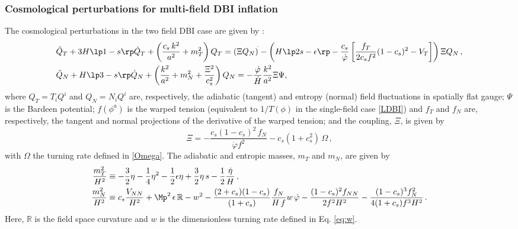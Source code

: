 \subsubsection*{Cosmological perturbations for multi-field DBI inflation}

The cosmological perturbations in the two field DBI case are given by \cite{Langlois:2008mn,Langlois:2008wt,Langlois:2008qf}:
\begin{subequations}
 \begin{align}
     &\ddot Q_T + 3H\lp 1-s \rp \dot Q_T + \left(\frac{c_s\,k^2}{a^2} +m_T^2  \right) Q_T = 
\left(\Xi Q_N\right)^{\Large\dot{}} -\left( H\lp 2s-\epsilon\rp - \frac{c_s}{\dot \varphi}\left[\frac{f_T}{2c_sf^2}(1-c_s)^2 - V_T\right] \right) \Xi Q_N\,, \label{QT} \\
& \ddot Q_N + H\lp 3-s\rp \dot Q_N + \left(\frac{k^2}{a^2} +m_N^2 +\frac{\Xi^2}{c_s^2} \right) Q_N =- 
\frac{\dot \varphi}{\dot H} \frac{k^2}{a^2}\Xi \Psi,  \label{QN}
 \end{align}
\end{subequations}
%
where $Q_T=T_i Q^i $ and $Q_N=N_i Q^i$ are, respectively, the adiabatic (tangent) and entropy (normal) field fluctuations in spatially flat gauge; $\Psi$ is the Bardeen potential; $f(\phi^a) $ is the warped tension (equivalent to $1/T(\phi)$ in the single-field case \eqref{LDBI}) and $f_T$ and $f_N$ are, respectively, the tangent and normal projections of the derivative of the warped tension; and the coupling, $\Xi$, is given by
\begin{equation}\label{eq:Xi}
\Xi= -\frac{c_s(1-c_s)^2 \,f_N}{\dot \varphi f^2} -c_s(1+c_s^2)\,\Omega \,,
\end{equation}
with $\Omega$ the turning rate defined in \eqref{Omega}.
The adiabatic and entropic masses,  $m_T$ and $m_N$,  are given by 
\begin{subequations}
 \begin{align}
\label{amass}
\frac{m^2_T}{H^2}  &\equiv -\frac{3}{2}\eta- \frac{1}{4}\eta^2 -\frac{1}{2} \epsilon\eta+\frac32\eta \,s -\frac{1}{2}\frac{\dot\eta}{H} \,,\\
\label{emass}
\frac{m_N^2}{H^2} & \equiv c_s\frac{V_{NN}}{H^2} + \Mp^2\, \epsilon  \,{\mathbb R} - 
 w^2 - \frac{(2+c_s)(1-c_s)}{(1+c_s)}\frac{f_N}{H\,f}w\, \dot \varphi  - \frac{(1-c_s)^2f_{NN} }{2f^2H^2} 
 -\frac{(1-c_s)^3 f_N^2}{4(1+c_s)f^3H^2}\,.
\end{align}
\end{subequations}
Here, ${\mathbb R} $ is the field space curvature and $w$ is the dimensionless turning rate defined in Eq. \eqref{eq:w}. 
  
